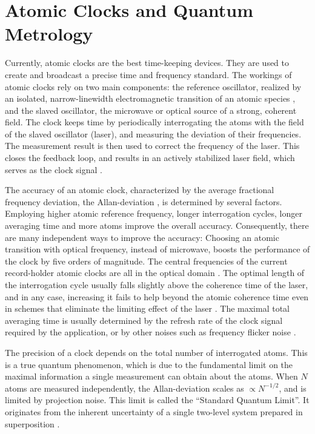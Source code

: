 \section{Atomic Clocks and Quantum Metrology}
Currently, atomic clocks are the best time-keeping devices. They are
used to create and broadcast a precise time and
frequency standard. The workings of atomic clocks rely on two main components: the
reference oscillator, realized by an isolated, narrow-linewidth electromagnetic
transition of an atomic species \cite{Derevianko2011}, and the slaved
oscillator, the microwave or optical source of a strong, coherent field. The
clock keeps time by periodically interrogating the atoms with the field of the
slaved oscillator (laser), and measuring the deviation of their frequencies.
The measurement result is then used to correct the frequency of the laser.
This closes the feedback loop, and results in an actively stabilized laser
field, which serves as the clock signal \cite{Diddams2004}.

The accuracy of an atomic clock, characterized by the average fractional
frequency deviation, the Allan-deviation \cite{Allan1966, Rutman1978}, is
determined by several factors. Employing higher atomic reference frequency,
longer interrogation cycles, longer averaging time and more atoms improve
the overall accuracy. Consequently, there are many independent ways to improve
the accuracy:
Choosing an atomic transition with optical frequency, instead of microwave,
boosts the performance of the clock by five orders of magnitude. The central
frequencies of the current record-holder atomic clocks are all in the optical
domain \cite{Ludlow2015}. The optimal length of the interrogation cycle usually falls
slightly above the coherence time of the laser, and in any case, increasing it
fails to help beyond the atomic coherence time even in schemes that eliminate
the limiting effect of the laser \cite{Borregaard2013, Rosenband2013}. The
maximal total averaging time is usually determined by the refresh rate of the
clock signal required by the application, or by other noises such as frequency
flicker noise \cite{Barnes1966}.

The precision of a clock depends on the total number of interrogated atoms.
This is a true quantum phenomenon, which is due to the fundamental limit on the
maximal information a single measurement can obtain about the atoms. When $N$
atoms are measured independently, the Allan-deviation scales as $\propto
N^{-1/2}$, and is limited by projection noise. This limit is called the
``Standard Quantum Limit''. It originates from the inherent uncertainty of a
single two-level system prepared in superposition \cite{Santarelli1998}.
 

